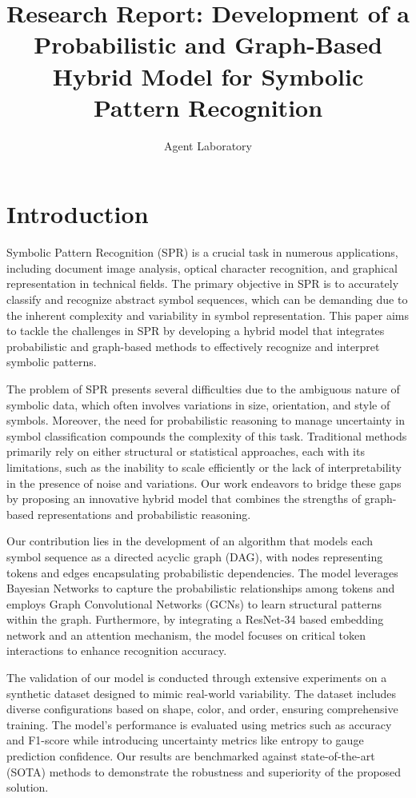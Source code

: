\documentclass{article}
\title{Research Report: Development of a Probabilistic and Graph-Based Hybrid Model for Symbolic Pattern Recognition}
\author{Agent Laboratory}
\date{}
\begin{document}
\maketitle

\begin{abstract}

\end{abstract}

\section{Introduction}
Symbolic Pattern Recognition (SPR) is a crucial task in numerous applications, including document image analysis, optical character recognition, and graphical representation in technical fields. The primary objective in SPR is to accurately classify and recognize abstract symbol sequences, which can be demanding due to the inherent complexity and variability in symbol representation. This paper aims to tackle the challenges in SPR by developing a hybrid model that integrates probabilistic and graph-based methods to effectively recognize and interpret symbolic patterns. 

The problem of SPR presents several difficulties due to the ambiguous nature of symbolic data, which often involves variations in size, orientation, and style of symbols. Moreover, the need for probabilistic reasoning to manage uncertainty in symbol classification compounds the complexity of this task. Traditional methods primarily rely on either structural or statistical approaches, each with its limitations, such as the inability to scale efficiently or the lack of interpretability in the presence of noise and variations. Our work endeavors to bridge these gaps by proposing an innovative hybrid model that combines the strengths of graph-based representations and probabilistic reasoning.

Our contribution lies in the development of an algorithm that models each symbol sequence as a directed acyclic graph (DAG), with nodes representing tokens and edges encapsulating probabilistic dependencies. The model leverages Bayesian Networks to capture the probabilistic relationships among tokens and employs Graph Convolutional Networks (GCNs) to learn structural patterns within the graph. Furthermore, by integrating a ResNet-34 based embedding network and an attention mechanism, the model focuses on critical token interactions to enhance recognition accuracy.

The validation of our model is conducted through extensive experiments on a synthetic dataset designed to mimic real-world variability. The dataset includes diverse configurations based on shape, color, and order, ensuring comprehensive training. The model's performance is evaluated using metrics such as accuracy and F1-score while introducing uncertainty metrics like entropy to gauge prediction confidence. Our results are benchmarked against state-of-the-art (SOTA) methods to demonstrate the robustness and superiority of the proposed solution.
\end{document}
